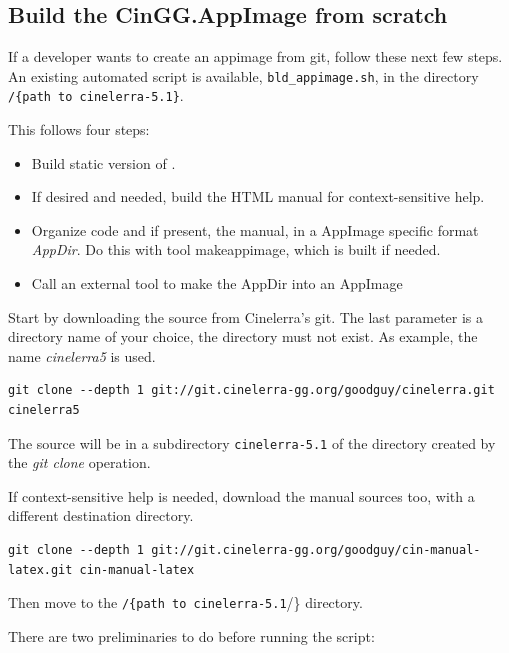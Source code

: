 \subsection{Build the CinGG.AppImage from scratch}%
\label{sub:built_appimage_scratch}

If a developer wants to create an appimage from git, follow these next few steps. An existing automated script is available, \texttt{bld\_appimage.sh}, in the directory \texttt{/\{path to cinelerra-5.1\}}.

This follows four steps:

\begin{itemize}
	\item Build static version of \CGG{}.
	\item If desired and needed, build the HTML manual for context-sensitive help.
	\item Organize code and if present, the manual, in a AppImage specific format \textit{AppDir}. Do this with tool makeappimage, which is built if needed.
	\item Call an external tool to make the AppDir into an AppImage
\end{itemize}

Start by downloading the \CGG{} source from Cinelerra's git. The last parameter is a directory name of your choice, the directory must not exist. As example, the name \textit{cinelerra5} is used.

\begin{lstlisting}[numbers=none]
	git clone --depth 1 git://git.cinelerra-gg.org/goodguy/cinelerra.git cinelerra5
\end{lstlisting}

The source will be in a subdirectory \texttt{cinelerra-5.1} of the directory created by the \textit{git clone} operation.

If context-sensitive help is needed, download the manual sources too, with a different destination directory.

\begin{lstlisting}[numbers=none]
	git clone --depth 1 git://git.cinelerra-gg.org/goodguy/cin-manual-latex.git cin-manual-latex
\end{lstlisting}

Then move to the \texttt{/\{path to cinelerra-5.1}/\} directory.


There are two preliminaries to do before running the script:

